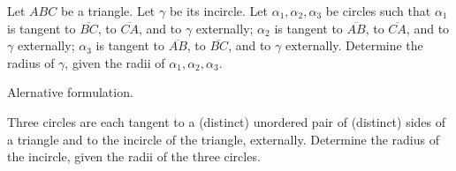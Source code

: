 Let $ABC$ be a triangle.
Let $\gamma$ be its incircle.  %
Let $\alpha_1, \alpha_2, \alpha_3$ be circles such that
$\alpha_1$ is tangent to $\overline{BC}$, to $\overline{CA}$, and to $\gamma$ externally;
$\alpha_2$ is tangent to $\overline{AB}$, to $\overline{CA}$, and to $\gamma$ externally;
$\alpha_3$ is tangent to $\overline{AB}$, to $\overline{BC}$, and to $\gamma$ externally.
Determine the radius of $\gamma$, given the radii of $\alpha_1, \alpha_2, \alpha_3$.

\medskip
Alernative formulation.

Three circles are each tangent to a (distinct) unordered pair of (distinct) sides of a triangle
and to the incircle of the triangle, externally.
Determine the radius of the incircle, given the radii of the three circles.

